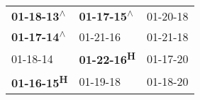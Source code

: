 \begin{supertabular}{lll}
 \textbf{01-18-13\textsuperscript{$\wedge$}} &  \textbf{01-17-15\textsuperscript{$\wedge$}} &  01-20-18\textsuperscript{} \\
 \textbf{01-17-14\textsuperscript{$\wedge$}} &                   01-21-16\textsuperscript{} &  01-21-18\textsuperscript{} \\
                  01-18-14\textsuperscript{} &         \textbf{01-22-16\textsuperscript{H}} &  01-17-20\textsuperscript{} \\
        \textbf{01-16-15\textsuperscript{H}} &                   01-19-18\textsuperscript{} &  01-18-20\textsuperscript{} \\
\end{supertabular}
